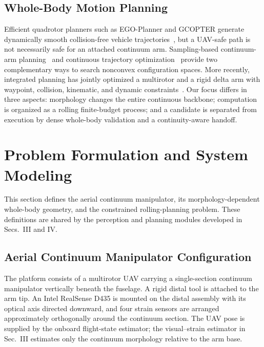 \documentclass[journal,twoside]{IEEEtran}
\begin{document}
\subsection{Whole-Body Motion Planning}
Efficient quadrotor planners such as EGO-Planner and GCOPTER generate dynamically smooth collision-free vehicle trajectories~\cite{zhou2021egoplanner,wang2022gcopter}, but a UAV-safe path is not necessarily safe for an attached continuum arm. Sampling-based continuum-arm planning~\cite{karaman2011sampling,meng2022rrtstar} and continuous trajectory optimization~\cite{schulman2014trajopt} provide two complementary ways to search nonconvex configuration spaces. More recently, integrated planning has jointly optimized a multirotor and a rigid delta arm with waypoint, collision, kinematic, and dynamic constraints~\cite{deng2025wholebody}. Our focus differs in three aspects: morphology changes the entire continuous backbone; computation is organized as a rolling finite-budget process; and a candidate is separated from execution by dense whole-body validation and a continuity-aware handoff.

\section{Problem Formulation and System Modeling}
This section defines the aerial continuum manipulator, its morphology-dependent whole-body geometry, and the constrained rolling-planning problem. These definitions are shared by the perception and planning modules developed in Secs.~III and IV.

\subsection{Aerial Continuum Manipulator Configuration}
The platform consists of a multirotor UAV carrying a single-section continuum manipulator vertically beneath the fuselage. A rigid distal tool is attached to the arm tip. An Intel RealSense D435 is mounted on the distal assembly with its optical axis directed downward, and four strain sensors are arranged approximately orthogonally around the continuum section. The UAV pose is supplied by the onboard flight-state estimator; the visual--strain estimator in Sec.~III estimates only the continuum morphology relative to the arm base.
\end{document}
